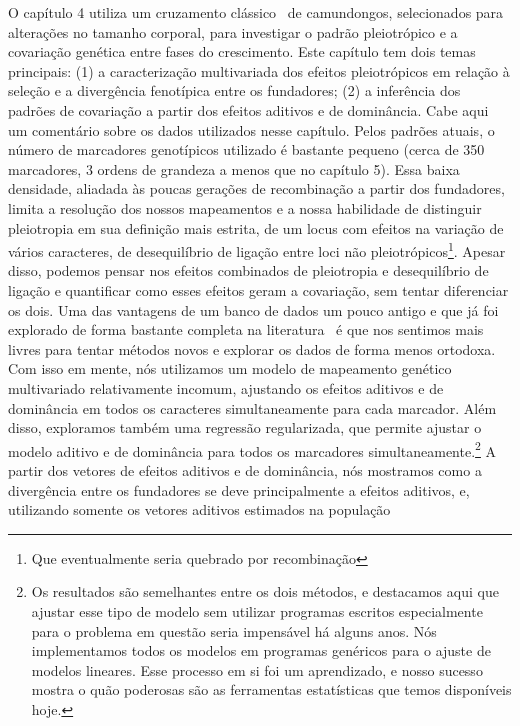 \begin{refsection}
O capítulo 4 utiliza um cruzamento clássico~\parencite[descrito
em][]{Cheverud1996-fm} de camundongos, selecionados para alterações no tamanho
corporal, para investigar o padrão pleiotrópico e a covariação genética entre
fases do crescimento. Este capítulo tem dois temas principais: (1) a
caracterização multivariada dos efeitos pleiotrópicos em relação à seleção e a divergência
fenotípica entre os fundadores; (2) a inferência dos padrões de covariação a
partir dos efeitos aditivos e de dominância. Cabe aqui um comentário sobre os
dados utilizados nesse capítulo. Pelos padrões atuais, o número de marcadores
genotípicos utilizado é bastante pequeno (cerca de 350 marcadores, 3 ordens de
grandeza a menos que no capítulo 5). Essa baixa densidade, aliadada às poucas
gerações de recombinação a partir dos fundadores, limita a resolução dos
nossos mapeamentos e a nossa habilidade de distinguir pleiotropia em sua
definição mais estrita, de um locus com efeitos na variação de vários
caracteres, de desequilíbrio de ligação entre loci não
pleiotrópicos\footnote{Que eventualmente seria quebrado por recombinação}.
Apesar disso, podemos pensar nos efeitos combinados de pleiotropia e
desequilíbrio de ligação e quantificar como esses efeitos geram a covariação,
sem tentar diferenciar os dois. Uma das vantagens de um banco de dados um pouco
antigo e que já foi explorado de forma bastante completa na
literatura~\parencite{Cheverud1996-fm, Kramer1998-cc, Hager2009-mz,
Vaughn1999-wt, Leamy2002-nh, Wolf2005-nr, Mitteroecker2016-vq} é que nos
sentimos mais livres para tentar métodos novos e explorar os dados de forma
menos ortodoxa. Com isso em mente, nós utilizamos um modelo de mapeamento
genético multivariado relativamente incomum, ajustando os efeitos aditivos e
de dominância em todos os caracteres simultaneamente para cada marcador. Além
disso, exploramos também uma regressão regularizada, que permite ajustar o
modelo aditivo e de dominância para todos os marcadores
simultaneamente.\footnote{Os resultados são semelhantes entre os dois métodos,
e destacamos aqui que ajustar esse tipo de modelo sem utilizar programas
escritos especialmente para o problema em questão seria impensável há alguns
anos. Nós implementamos todos os modelos em programas genéricos para o ajuste
de modelos lineares. Esse processo em si foi um aprendizado, e nosso sucesso
mostra o quão poderosas são as ferramentas estatísticas que temos disponíveis
hoje.} A partir dos vetores de efeitos aditivos e de dominância, nós mostramos
como a divergência entre os fundadores se deve principalmente a efeitos
aditivos, e, utilizando somente os vetores aditivos estimados na população

\end{refsection}
